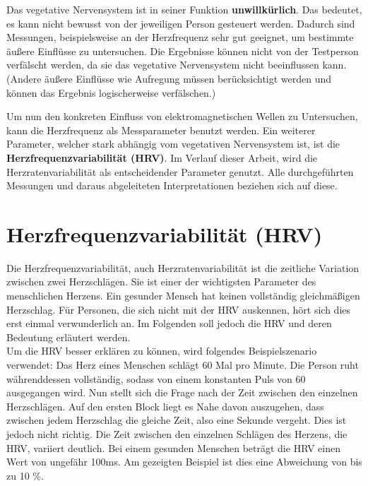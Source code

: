 Das vegetative Nervensystem ist in seiner Funktion \textbf{unwillkürlich}. Das bedeutet, es kann nicht bewusst von der jeweiligen Person gesteuert werden. Dadurch sind Messungen, beispielsweise an der Herzfrequenz sehr gut geeignet, um bestimmte äußere Einflüsse zu untersuchen.
Die Ergebnisse können nicht von der Testperson verfälscht werden, da sie das vegetative Nervensystem nicht beeinflussen kann. (Andere äußere Einflüsse wie Aufregung müssen berücksichtigt werden und können das Ergebnis logischerweise verfälschen.)\cite{veg}
		
Um nun den konkreten Einfluss von elektromagnetischen Wellen zu Untersuchen, kann die Herzfrequenz als Messparameter benutzt werden. Ein weiterer Parameter, welcher stark abhängig vom vegetativen Nervensystem ist, ist die \textbf{Herzfrequenzvariabilität (HRV)}. Im Verlauf dieser Arbeit, wird die Herzratenvariabilität als entscheidender Parameter genutzt. Alle durchgeführten Messungen und daraus abgeleiteten Interpretationen beziehen sich auf diese. 


\section{Herzfrequenzvariabilität (HRV)}
Die Herzfrequenzvariabilität, auch Herzratenvariabilität ist die zeitliche Variation zwischen zwei Herzschlägen. Sie ist einer der wichtigsten Parameter des menschlichen Herzens. Ein gesunder Mensch hat keinen vollständig gleichmäßigen Herzschlag. Für Personen, die sich nicht mit der HRV auskennen, hört sich dies erst einmal verwunderlich an. Im Folgenden soll jedoch die HRV und deren Bedeutung erläutert werden. \\
Um die HRV besser erklären zu können, wird folgendes Beispielszenario verwendet: Das Herz eines Menschen schlägt 60 Mal pro Minute. Die Person ruht währenddessen vollständig, sodass von einem konstanten Puls von 60 ausgegangen wird. Nun stellt sich die Frage nach der Zeit zwischen den einzelnen Herzschlägen. Auf den ersten Block liegt es Nahe davon auszugehen, dass zwischen jedem Herzschlag die gleiche Zeit, also eine Sekunde vergeht. Dies ist jedoch nicht richtig. Die Zeit zwischen den einzelnen Schlägen des Herzens, die HRV,  variiert deutlich.  Bei einem gesunden Menschen beträgt die HRV einen Wert von ungefähr 100ms. Am gezeigten Beispiel ist dies eine Abweichung von bis zu 10 \%.\cite[S.20ff]{babilon}\cite{hrv} \\

